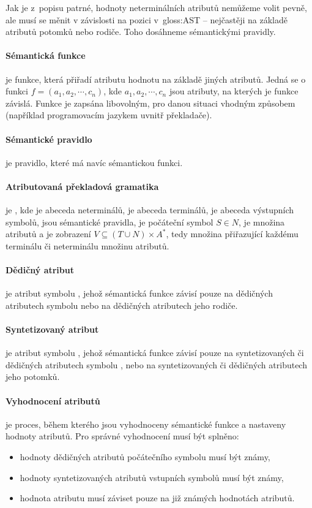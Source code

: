 		Jak je z~popisu patrné, hodnoty neterminálních atributů nemůžeme volit pevně, ale musí se měnit v závislosti na pozici v~\gls{gloss:AST} -- nejčastěji na základě atributů potomků nebo rodiče. Toho dosáhneme sémantickými pravidly.
		
		\paragraph{Sémantická funkce}
		je funkce, která přiřadí atributu hodnotu na základě jiných atributů. Jedná se o funkci $f=(a_1,a_2,\cdots,c_n)$, kde $a_1,a_2,\cdots,c_n$ jsou atributy, na kterých je funkce závislá. Funkce je zapsána libovolným, pro danou situaci vhodným způsobem (například programovacím jazykem uvnitř překladače).
		\paragraph{Sémantické pravidlo}
		je pravidlo, které má navíc sémantickou funkci.
		\paragraph{Atributovaná překladová gramatika}
		je \AttributTranslateGrammarDef, kde  je abeceda neterminálů,  je abeceda terminálů,  je abeceda výstupních symbolů,  jsou sémantické pravidla,  je počáteční symbol $S\in N$,  je množina atributů a  je zobrazení $V\subseteq\left(T\cup N\right)\times{A}^\ast$, tedy množina přiřazující každému terminálu či neterminálu množinu atributů.
		\paragraph{Dědičný atribut}
		je atribut  symbolu , jehož sémantická funkce  závisí pouze na dědičných atributech symbolu  nebo na dědičných atributech jeho rodiče.
		\paragraph{Syntetizovaný atribut}
		je atribut  symbolu , jehož sémantická funkce závisí pouze na syntetizovaných či dědičných atributech symbolu , nebo na syntetizovaných či dědičných atributech jeho potomků.
		\paragraph{Vyhodnocení atributů}
		je proces, během kterého jsou vyhodnoceny sémantické funkce a nastaveny hodnoty atributů. Pro správné vyhodnocení musí být splněno:
		\begin{itemize}
			\item hodnoty dědičných atributů počátečního symbolu musí být známy,
			\item hodnoty syntetizovaných atributů vstupních symbolů musí být známy,
			\item hodnota atributu musí záviset pouze na již známých hodnotách atributů.
		\end{itemize}
		
